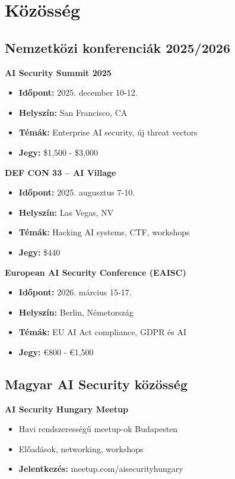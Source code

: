 \documentclass{../templates/magazine}
\begin{document}
\newpage

\section{Közösség}

\subsection{Nemzetközi konferenciák 2025/2026}

\textbf{AI Security Summit 2025}
\begin{itemize}
    \item \textbf{Időpont:} 2025. december 10-12.
    \item \textbf{Helyszín:} San Francisco, CA
    \item \textbf{Témák:} Enterprise AI security, új threat vectors
    \item \textbf{Jegy:} \$1,500 - \$3,000
\end{itemize}

\textbf{DEF CON 33 -- AI Village}
\begin{itemize}
    \item \textbf{Időpont:} 2025. augusztus 7-10.
    \item \textbf{Helyszín:} Las Vegas, NV
    \item \textbf{Témák:} Hacking AI systems, CTF, workshops
    \item \textbf{Jegy:} \$440
\end{itemize}

\textbf{European AI Security Conference (EAISC)}
\begin{itemize}
    \item \textbf{Időpont:} 2026. március 15-17.
    \item \textbf{Helyszín:} Berlin, Németország
    \item \textbf{Témák:} EU AI Act compliance, GDPR és AI
    \item \textbf{Jegy:} €800 - €1,500
\end{itemize}

\subsection{Magyar AI Security közösség}

\textbf{AI Security Hungary Meetup}
\begin{itemize}
    \item Havi rendszerességű meetup-ok Budapesten
    \item Előadások, networking, workshops
    \item \textbf{Jelentkezés:} meetup.com/aisecurityhungary
\end{itemize}
\end{document}
